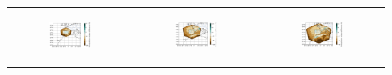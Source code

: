 \begin{figure}[htbp]
    \centering
    \begin{tabular}{ccc}
        \begin{subfigure}[b]{0.33\textwidth}
            \caption{}
            \includegraphics[width=\textwidth]{images/chap4/domain_size/rel_diff_map_precip_era_LAM_1000km_NBP40.png}
        \end{subfigure} &
        \begin{subfigure}[b]{0.33\textwidth}
            \caption{}
            \includegraphics[width=\textwidth]{images/chap4/domain_size/rel_diff_map_precip_era_LAM_1500km_NBP60.png}
        \end{subfigure} &
        \begin{subfigure}[b]{0.33\textwidth}
            \caption{}
            \includegraphics[width=\textwidth]{images/chap4/domain_size/rel_diff_map_precip_era_LAM_2000km_NBP80.png}

\end{subfigure}
\end{tabular}
\end{figure}
